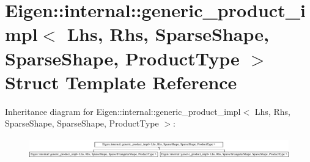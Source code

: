 \hypertarget{struct_eigen_1_1internal_1_1generic__product__impl_3_01_lhs_00_01_rhs_00_01_sparse_shape_00_01_s0f15bf86456099378e4a76f37323e721}{}\section{Eigen\+::internal\+::generic\+\_\+product\+\_\+impl$<$ Lhs, Rhs, Sparse\+Shape, Sparse\+Shape, Product\+Type $>$ Struct Template Reference}
\label{struct_eigen_1_1internal_1_1generic__product__impl_3_01_lhs_00_01_rhs_00_01_sparse_shape_00_01_s0f15bf86456099378e4a76f37323e721}
Inheritance diagram for Eigen\+::internal\+::generic\+\_\+product\+\_\+impl$<$ Lhs, Rhs, Sparse\+Shape, Sparse\+Shape, Product\+Type $>$\+:\begin{figure}[H]
\begin{center}
\leavevmode
\includegraphics[height=0.916530cm]{struct_eigen_1_1internal_1_1generic__product__impl_3_01_lhs_00_01_rhs_00_01_sparse_shape_00_01_s0f15bf86456099378e4a76f37323e721}
\end{center}
\end{figure}
